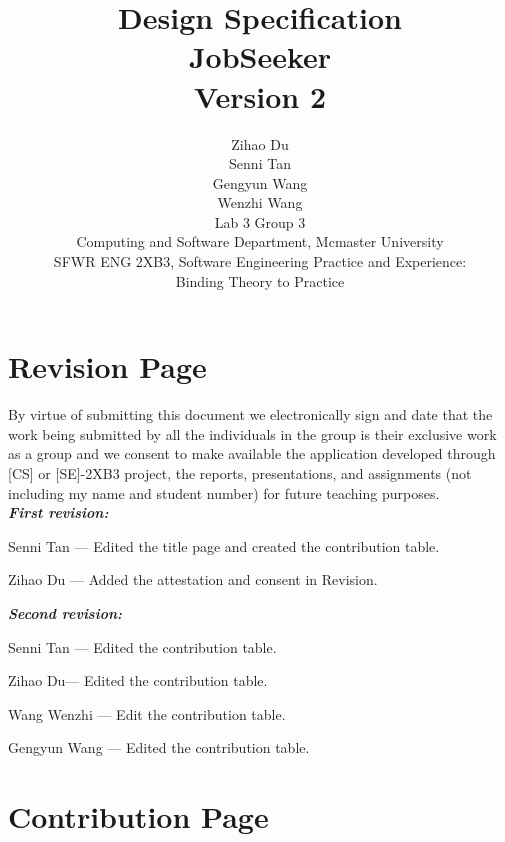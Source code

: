 \documentclass[12pt]{article}
\title{Design Specification \\ 
JobSeeker \\ 
\large Version 2}
\author{Zihao Du\\
Senni Tan\\
Gengyun Wang\\
Wenzhi Wang\\
Lab 3 Group 3\\
Computing and Software Department, Mcmaster University \\
SFWR ENG 2XB3, Software Engineering Practice and Experience:\\ Binding Theory to Practice\\
}
\begin{document}
\maketitle
\newpage

\section*{Revision Page}
\noindent By  virtue  of  submitting  this  document  we  electronically  sign  and  date  that  the  work  being  submitted  by  all  the individuals  in  the  group  is  their  exclusive  work  as  a  group  and  we  consent  to  make  available  the  application developed  through  [CS]  or  [SE]-2XB3  project,  the  reports,  presentations,  and  assignments  (not  including  my name and student number) for future teaching purposes.\\
\noindent \textbf{\emph{First revision:}}
\begin{description}
\item    Senni Tan --- Edited the title page and created the contribution table.
\item    Zihao Du --- Added the attestation and consent in Revision.
\end{description}
\noindent \textbf{\emph{Second revision:}}
\begin{description}
\item    Senni Tan --- Edited the contribution table.
\item    Zihao Du--- Edited the contribution table.
\item    Wang Wenzhi --- Edit the contribution table.
\item    Gengyun Wang --- Edited the contribution table.
\end{description}
\newpage

\section*{Contribution Page}
\end{document}
